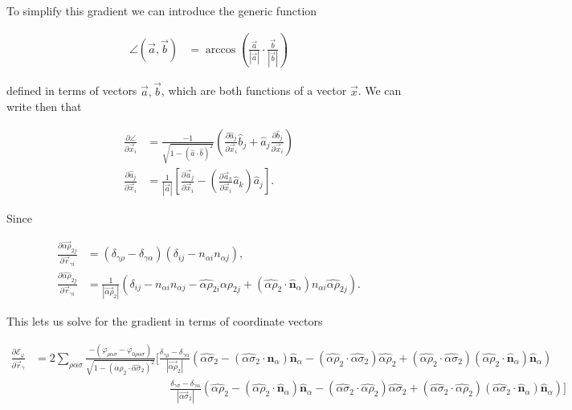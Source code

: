 \documentclass[draft]{article}
\newcommand{\e}{\mathcal{E}}
\newcommand{\bh}[1]{\hat{\bm{#1}}}
\begin{document}
To simplify this gradient we can introduce the generic function

\begin{align*}
	\angle(\vec{a}, \vec{b}) &= \arccos \left(\frac{\vec{a}}{|\vec{a}|} \cdot \frac{\vec{b}}{|\vec{b}|}\right)
\end{align*}

defined in terms of vectors $\vec{a}, \vec{b}$, which are both functions of a vector $\vec{x}$. We can write then that 

\begin{align*}
	\frac{\partial \angle}{\partial \vec{x}_i} &= \frac{-1}{\sqrt{1 - (\hat{a}\cdot\hat{b})^2}} \left(\frac{\partial \hat{a}_j}{\partial \vec{x}_i} \hat{b}_j + \hat{a}_j \frac{\partial \hat{b}_j}{\partial \vec{x}_i} \right) \\
	\frac{\partial \hat{a}_j}{\partial \vec{x}_i} &= \frac{1}{\left|\vec{a} \right|} \left[\frac{\partial \vec{a}_j}{\partial \vec{x}_i} - \left( \frac{\partial \vec{a}_k}{\partial\vec{x}_i} \hat{a}_k \right) \hat{a}_j \right].
\end{align*}

\noindent Since 

\begin{align*}
	\frac{\partial \vec{\alpha\rho}_{2j}}{\partial \vec{r}_{\gamma i}} &= \left(\delta_{\gamma \rho} - \delta_{\gamma \alpha} \right) \left(\delta_{ij} - n_{\alpha i} n_{\alpha j} \right), \\
	\frac{\partial \hat{\alpha\rho}_{2j}}{\partial \vec{r}_{\gamma i}} &= \frac{1}{|\vec{\alpha\rho}_2|} \left(\delta_{ij} - n_{\alpha i} n_{\alpha j} - \hat{\alpha\rho}_{2i} \hat{\alpha\rho}_{2j} + (\hat{\alpha\rho}_2 \cdot \bh{n}_\alpha) n_{\alpha i} \hat{\alpha\rho}_{2j} \right).
\end{align*}

\noindent This lets us solve for the gradient in terms of coordinate vectors 

\begin{align*}
	\frac{\partial \e_\varphi}{\partial \vec{r}_\gamma} &= 2 \sum_{\rho\alpha\sigma} \frac{-(\varphi_{\rho\alpha\sigma} - \varphi_{0\rho\alpha\sigma})}{\sqrt{1-(\hat{\alpha\rho}_2 \cdot \hat{\alpha\sigma}_2)^2}} \Big[ \frac{\delta_{\gamma\rho} - \delta_{\gamma\alpha}}{|\vec{\alpha\rho}_2|} \left(\hat{\alpha\sigma}_2 - (\hat{\alpha\sigma}_2 \cdot \bh{n}_\alpha)\bh{n}_\alpha - (\hat{\alpha\rho}_2\cdot\hat{\alpha\sigma}_2) \hat{\alpha\rho}_2 + (\hat{\alpha\rho}_2\cdot\hat{\alpha\sigma}_2)(\hat{\alpha\rho}_2\cdot\bh{n}_\alpha)\bh{n}_\alpha \right) \\
	&\qquad\qquad\qquad\qquad\qquad\qquad \frac{\delta_{\gamma\sigma} - \delta_{\gamma\alpha}}{|\vec{\alpha\sigma}_2|} \left(\hat{\alpha\rho}_2 - (\hat{\alpha\rho}_2 \cdot \bh{n}_\alpha)\bh{n}_\alpha - (\hat{\alpha\sigma}_2\cdot\hat{\alpha\rho}_2) \hat{\alpha\sigma}_2 + (\hat{\alpha\sigma}_2\cdot\hat{\alpha\rho}_2)(\hat{\alpha\sigma}_2\cdot\bh{n}_\alpha)\bh{n}_\alpha \right) \Big]
\end{align*}
\end{document}

